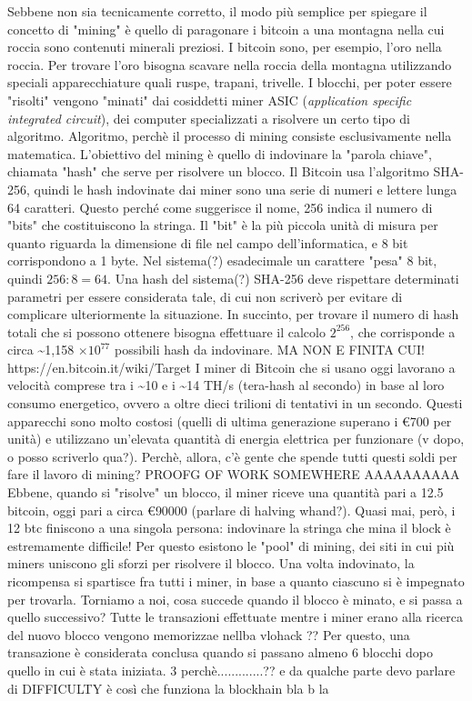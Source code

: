 \documentclass {article}
\begin{document}
Sebbene non sia tecnicamente corretto, il modo più semplice per spiegare il concetto di "mining" è quello di paragonare i bitcoin a una montagna nella cui roccia sono contenuti minerali preziosi.
I bitcoin sono, per esempio, l'oro nella roccia.
Per trovare l'oro bisogna scavare nella roccia della montagna utilizzando speciali apparecchiature quali ruspe, trapani, trivelle.
I blocchi, per poter essere "risolti" vengono "minati" dai cosiddetti miner ASIC (\textit{application specific integrated circuit}), dei computer specializzati a risolvere un certo tipo di algoritmo.
Algoritmo, perchè il processo di mining consiste esclusivamente nella matematica.
L'obiettivo del mining è quello di indovinare la "parola chiave", chiamata "hash" che serve per risolvere un blocco.
Il Bitcoin usa l'algoritmo SHA-256, quindi le hash indovinate dai miner sono una serie di numeri e lettere lunga 64 caratteri.
Questo perché come suggerisce il nome, 256 indica il numero di "bits" che costituiscono la stringa.
Il "bit" è la più piccola unità di misura per quanto riguarda la dimensione di file nel campo dell'informatica, e 8 bit corrispondono a 1 byte.
Nel sistema(?) esadecimale un carattere "pesa" 8 bit, quindi $256 : 8 = 64$.
Una hash del sistema(?) SHA-256 deve rispettare determinati parametri per essere considerata tale, di cui non scriverò per evitare di complicare ulteriormente la situazione.
In succinto, per trovare il numero di hash totali che si possono ottenere bisogna effettuare il  calcolo $2^{256}$, che corrisponde a circa \textasciitilde 1,158 $\times 10^{77}$ possibili hash da indovinare.
MA NON E FINITA CUI! https://en.bitcoin.it/wiki/Target
I miner di Bitcoin che si usano oggi lavorano a velocità comprese tra i \textasciitilde 10 e i \textasciitilde 14 TH/s (tera-hash al secondo) in base al loro consumo energetico, ovvero a oltre dieci trilioni di tentativi in un secondo.
Questi apparecchi sono molto costosi (quelli di ultima generazione superano i \euro{700} per unità) e utilizzano un'elevata quantità di energia elettrica per funzionare (v dopo, o posso scriverlo qua?).
Perchè, allora, c'è gente che spende tutti questi soldi per fare il lavoro di mining? PROOFG  OF WORK SOMEWHERE AAAAAAAAAA
Ebbene, quando si "risolve" un blocco, il miner riceve una quantità pari a 12.5 bitcoin, oggi pari a circa \euro{90000} (parlare di halving whand?).
Quasi mai, però, i 12 btc finiscono a una singola persona: indovinare la stringa che mina il block è estremamente difficile!
Per questo esistono le "pool" di mining, dei siti in cui più miners uniscono gli sforzi per risolvere il blocco.
Una volta indovinato, la ricompensa si spartisce fra tutti i miner, in base a quanto ciascuno si è impegnato per trovarla.
Torniamo a noi, cosa succede quando il blocco è minato, e si passa a quello successivo?
Tutte le transazioni effettuate mentre i miner erano alla ricerca del nuovo blocco vengono memorizzae nellba vlohack ??
Per questo, una transazione è considerata conclusa quando si passano almeno 6 blocchi dopo quello in cui è stata iniziata.
3 perchè.............?? e da qualche parte devo parlare di DIFFICULTY
è così che funziona la blockhain bla b la
\end{document}
